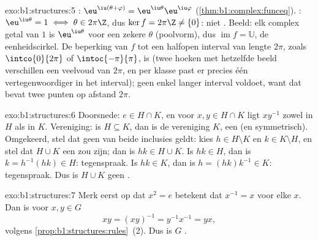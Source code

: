 \begin{solution}{exo:b1:structures:5}
: $\eu^{\iu(\theta + \varphi)} = \eu^{\iu\theta}\eu^{\iu\varphi}$
(\cref{thm:b1:complex:funceq}). : $\eu^{\iu\theta} = 1 \iff \theta \in
2\pi\Z$, dus $\ker f = 2\pi\Z \neq \{0\}$: niet . Beeld: elk
complex getal van  $1$ is $\eu^{\iu\theta}$ voor een zekere
$\theta$ (poolvorm), dus $\operatorname{im} f = \mathbb{U}$, de
eenheidscirkel. De beperking van $f$ tot een halfopen interval van lengte
$2\pi$, zoals $\intco{0}{2\pi}$ of $\intoc{-\pi}{\pi}$, is  (twee
hoeken met hetzelfde beeld verschillen een veelvoud van $2\pi$, en per
klasse past er precies één vertegenwoordiger in het interval); geen enkel
langer interval voldoet, want dat bevat twee punten op afstand $2\pi$.
\end{solution}

\begin{solution}{exo:b1:structures:6}
Doorsnede: $e \in H \cap K$, en voor $x, y \in H \cap K$ ligt $xy^{-1}$
zowel in $H$ als in $K$. Vereniging: is $H \subseteq K$, dan is de
vereniging $K$, een  (en symmetrisch). Omgekeerd, stel dat geen
van beide inclusies geldt: kies $h \in H \setminus K$ en $k \in K
\setminus H$, en stel dat $H \cup K$ een  zou zijn; dan is $hk
\in H \cup K$. Is $hk \in H$, dan is $k = h^{-1}(hk) \in H$: tegenspraak.
Is $hk \in K$, dan is $h = (hk)k^{-1} \in K$: tegenspraak. Dus is $H \cup
K$ geen .
\end{solution}

\begin{solution}{exo:b1:structures:7}
Merk eerst op dat $x^2 = e$ betekent dat $x^{-1} = x$ voor elke $x$. Dan
is voor $x, y \in G$
\[
xy = (xy)^{-1} = y^{-1} x^{-1} = yx ,
\]
volgens \cref{prop:b1:structures:rules}~(2). Dus is $G$ .
\end{solution}

